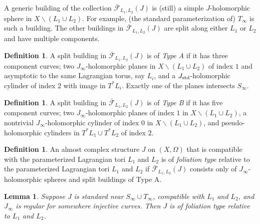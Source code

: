 \documentclass[12pt]{amsart}
\newtheorem{lemma}[theorem]{Lemma}
\theoremstyle{definition}
\newtheorem{definition}[theorem]{Definition}
\begin{document}
A generic building of the collection $\bar{\mathcal{F}}_{L_1,L_2}(J)$ is (still) a simple $J$-holomorphic sphere in $X \smallsetminus (L_1 \cup L_2)$. For example, (the standard parameterization of) $T_{\infty}$ is such a building. The other buildings in $\bar{\mathcal{F}}_{L_1,L_2}(J)$ are split along either $L_1$ or $L_2$ and have multiple components. 


\begin{definition}\label{one}
    A split building in $\bar{\mathcal{F}}_{L_1,L_2}(J)$ is of {\it Type A} if it has three component curves; two $J_{\infty}$-holomorphic planes  in $X \smallsetminus (L_1 \cup L_2)$ of index $1$ and asymptotic to the same Lagrangian torus, say  $L_i$, and a $J_{\rm std}$-holomorphic cylinder of index $2$ with image in $T^*L_i$. Exactly one of the planes intersects $S_{\infty}$.  
\end{definition}


\begin{definition}\label{two}
    A split building in $\bar{\mathcal{F}}_{L_1,L_2}(J)$ is of {\it Type B} if it has five component curves; two  $J_{\infty}$-holomorphic planes of index $1$ in $X \smallsetminus (L_1 \cup L_2)$, %
    a nontrivial $J_{\infty}$-holomorphic cylinder of index 0 in  $X \smallsetminus (L_1 \cup L_2)$, and  
pseudo-holomorphic cylinders in $T^*L_1 \cup T^*L_2$ of index $2$. 
\end{definition}

\begin{definition}
    An almost complex structure $J$ on $(X, \Omega)$ that is compatible with the parameterized Lagrangian tori $L_1$ and $L_2$ is of {\it foliation type} relative to the parameterized Lagrangian tori $L_1$ and $L_2$ if $\bar{\mathcal{F}}_{L_1,L_2}(J)$ consists only of $J_{\infty}$-holomorphic spheres and split buildings of Type A.
\end{definition}


\begin{lemma}\label{lem:noB}
Suppose  $J$ is standard near  $S_{\infty} \cup T_{\infty}$, compatible with $L_1$ and $L_2$,  and $J_{\infty}$ is regular for somewhere injective curves. Then $J$ is of foliation type relative to $L_1$ and $L_2$.  
\end{lemma}
\end{document}
